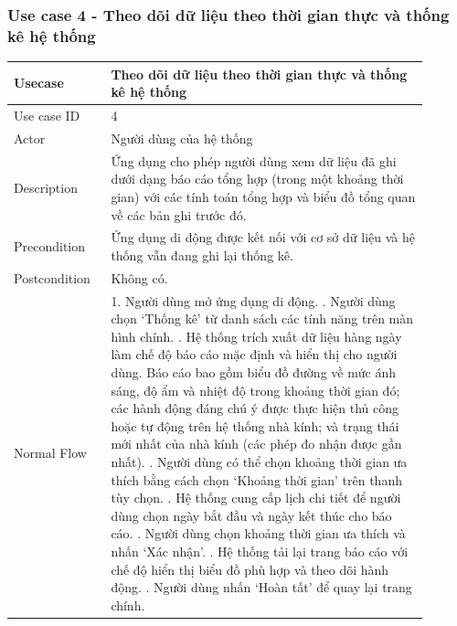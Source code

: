 \subsubsection{Use case 4 - Theo dõi dữ liệu theo thời gian thực và thống kê hệ thống}
\renewcommand{\arraystretch}{1.6}
\begin{table}[H]
\centering
\begin{tabular}{|p{0.2\linewidth}|p{0.7\linewidth}|}
\hline
\rowcolor[HTML]{EFEFEF} 
\textbf{Usecase}        & \textbf{Theo dõi dữ liệu theo thời gian thực và thống kê hệ thống} \\ \hline
Use case ID             & 4 \\ \hline
Actor                   & Người dùng của hệ thống \\ \hline
Description             & Ứng dụng cho phép người dùng xem dữ liệu đã ghi dưới dạng báo cáo tổng hợp (trong một khoảng thời gian) với các tính toán tổng hợp và biểu đồ tổng quan về các bản ghi trước đó. \\ \hline
Precondition            & Ứng dụng di động được kết nối với cơ sở dữ liệu và hệ thống vẫn đang ghi lại thống kê. \\ \hline
Postcondition           & Không có.  \\ \hline
Normal Flow             & 
    1. Người dùng mở ứng dụng di động. \newline
    2. Người dùng chọn `Thống kê' từ danh sách các tính năng trên màn hình chính. \newline
    3. Hệ thống trích xuất dữ liệu hàng ngày làm chế độ báo cáo mặc định và hiển thị cho người dùng. Báo cáo bao gồm biểu đồ đường về mức ánh sáng, độ ẩm và nhiệt độ trong khoảng thời gian đó; các hành động đáng chú ý được thực hiện thủ công hoặc tự động trên hệ thống nhà kính; và trạng thái mới nhất của nhà kính (các phép đo nhận được gần nhất). \newline
    4. Người dùng có thể chọn khoảng thời gian ưa thích bằng cách chọn `Khoảng thời gian' trên thanh tùy chọn. \newline
    5. Hệ thống cung cấp lịch chi tiết để người dùng chọn ngày bắt đầu và ngày kết thúc cho báo cáo. \newline
    6. Người dùng chọn khoảng thời gian ưa thích và nhấn `Xác nhận'. \newline
    7. Hệ thống tải lại trang báo cáo với chế độ hiển thị biểu đồ phù hợp và theo dõi hành động. \newline
    8. Người dùng nhấn `Hoàn tất' để quay lại trang chính.
\\ \hline

\end{tabular}
\end{table}
